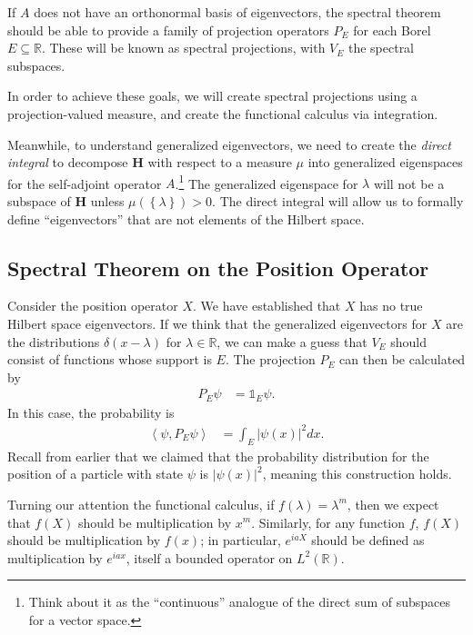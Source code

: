 \documentclass[12pt]{extarticle}
\newcommand{\R}{\mathbb{R}}
\newcommand{\set}[1]{\left\{#1\right\}}
\newcommand{\iprod}[2]{\left\langle #1,#2\right\rangle}
\theoremstyle{plain}
\theoremstyle{definition}
\theoremstyle{remark}
\renewcommand{\newline}{\hfill\break}
\begin{document}
  If $A$ does not have an orthonormal basis of eigenvectors, the spectral theorem should be able to provide a family of projection operators $P_E$ for each Borel $E\subseteq \R$. These will be known as spectral projections, with $V_E$ the spectral subspaces.\newline

  In order to achieve these goals, we will create spectral projections using a projection-valued measure, and create the functional calculus via integration.\newline

  Meanwhile, to understand generalized eigenvectors, we need to create the \textit{direct integral} to decompose $\mathbf{H}$ with respect to a measure $\mu$ into generalized eigenspaces for the self-adjoint operator $A$.\footnote{Think about it as the ``continuous'' analogue of the direct sum of subspaces for a vector space.} The generalized eigenspace for $\lambda$ will not be a subspace of $\mathbf{H}$ unless $\mu\left(\set{\lambda}\right) > 0$. The direct integral will allow us to formally define ``eigenvectors'' that are not elements of the Hilbert space.
  \subsection{Spectral Theorem on the Position Operator}%
  Consider the position operator $X$. We have established that $X$ has no true Hilbert space eigenvectors. If we think that the generalized eigenvectors for $X$ are the distributions $\delta(x-\lambda)$ for $\lambda \in \R$, we can make a guess that $V_E$ should consist of functions whose support is $E$. The projection $P_E$ can then be calculated by
  \begin{align*}
    P_E\psi &= \mathbb{1}_{E}\psi.
  \end{align*}
  In this case, the probability is
  \begin{align*}
    \iprod{\psi}{P_E\psi} &= \int_{E}|\psi(x)|^2dx.
  \end{align*}
  Recall from earlier that we claimed that the probability distribution for the position of a particle with state $\psi$ is $|\psi(x)|^2$, meaning this construction holds.\newline

  Turning our attention the functional calculus, if $f(\lambda) = \lambda^m$, then we expect that $f(X)$ should be multiplication by $x^m$. Similarly, for any function $f$, $f(X)$ should be multiplication by $f(x)$; in particular, $e^{iaX}$ should be defined as multiplication by $e^{iax}$, itself a bounded operator on $L^2(\R)$.
\end{document}
